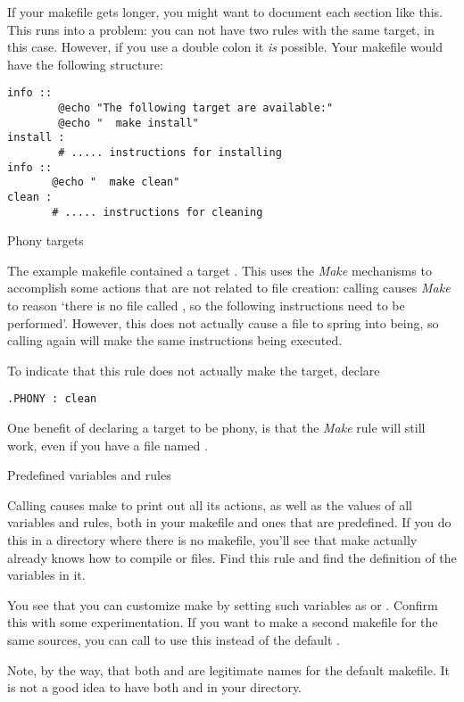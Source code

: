 If your makefile gets longer, you might want to document each section
like this. This runs into a problem: you can not have two rules with the same
target,  in this case. However, if you use a double colon
it \emph{is} possible. Your makefile would have the following structure:
\begin{verbatim}
info ::
        @echo "The following target are available:"
        @echo "  make install"
install :
        # ..... instructions for installing
info ::
       @echo "  make clean"
clean :
       # ..... instructions for cleaning
\end{verbatim}
 {Phony targets}

The example makefile contained a target . This uses
the \emph{Make} mechanisms to accomplish some actions that are not
related to file creation: calling  causes \emph{Make} to
reason `there is no file called , so the following
instructions need to be performed'. However, this does not actually
cause a file  to spring into being, so calling 
again will make the same instructions being executed.

To indicate that this rule does not actually make the target, declare
\begin{verbatim}
.PHONY : clean
\end{verbatim}
One benefit of declaring a target to be phony, is that the \emph{Make}
rule will still work, even if you have a file named .

 {Predefined variables and rules}

Calling  causes make to print out all its
actions, as well as the values of all variables and rules, both in
your makefile and ones that are predefined. If you do this in a
directory where there is no makefile, you'll see that make actually
already knows how to compile  or  files. Find this rule
and find the definition of the variables in it.

You see that you can customize make by setting such variables as
 or . Confirm this with some experimentation. If
you want to make a second makefile for the same sources, you can call
 to use this instead of the default
.

Note, by the way, that both  and  are
legitimate names for the default makefile. It is not a good idea to
have both  and  in your directory.

